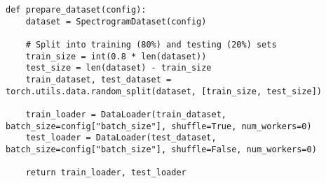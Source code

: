 \begin{lstlisting}[caption={Creating data loaders with train-test split}]
def prepare_dataset(config):
    dataset = SpectrogramDataset(config)
    
    # Split into training (80%) and testing (20%) sets
    train_size = int(0.8 * len(dataset))
    test_size = len(dataset) - train_size
    train_dataset, test_dataset = torch.utils.data.random_split(dataset, [train_size, test_size])

    train_loader = DataLoader(train_dataset, batch_size=config["batch_size"], shuffle=True, num_workers=0)
    test_loader = DataLoader(test_dataset, batch_size=config["batch_size"], shuffle=False, num_workers=0)

    return train_loader, test_loader
\end{lstlisting}

